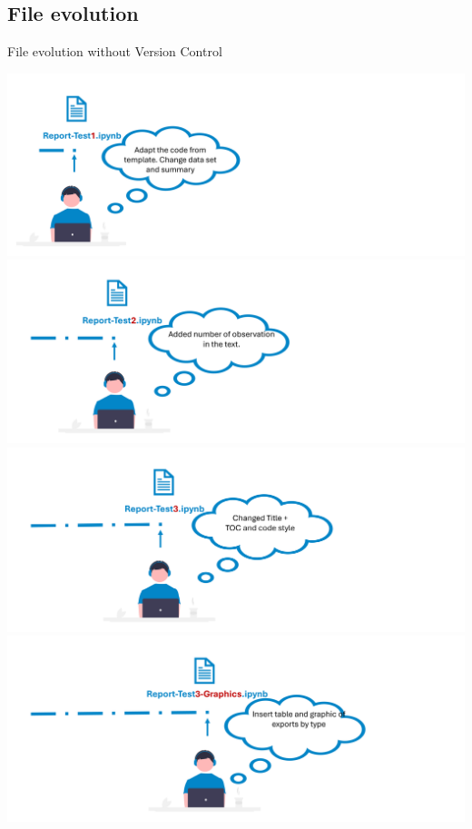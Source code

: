 \documentclass[xcolor=x11names,compress]{beamer}
\renewcommand{\(}{\begin{columns}}
\renewcommand{\)}{\end{columns}}
\newcommand{\<}[1]{\begin{column}{#1}}
\renewcommand{\>}{\end{column}}
\begin{document}
\subsection{File evolution}

\begin{frame}{File evolution  \textcolor{brique}{without Version Control}  }
\begin{center}
\begin{itemize}
    {\includegraphics[width = 1.0\textwidth]{FileChange1a.png} \\ }
    {\includegraphics[width = 1.0\textwidth]{FileChange2a.png} \\ }
    {\includegraphics[width = 1.0\textwidth]{FileChange3a.png} \\ }
    {\includegraphics[width = 1.0\textwidth]{FileChange4a.png} \\ }

\end{itemize}
\end{center}
\end{frame}
\end{document}
